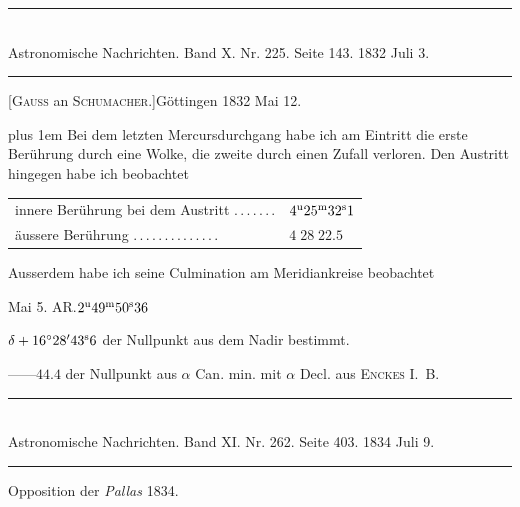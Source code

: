 \clearpage
{}
\begin{center}
\rule{0.55\linewidth}{0.4pt}\\[2pt]
Astronomische Nachrichten. Band X. Nr. 225. Seite 143. 1832 Juli 3.\\[2pt]
\rule{0.55\linewidth}{0.4pt}
\end{center}

\begin{center}[\textsc{Gauss} an \textsc{Schumacher.}]\quad Göttingen 1832 Mai 12.\end{center}

{\rightskip=0pt plus 1em Bei dem letzten Mercursdurchgang habe ich am Eintritt die erste Berührung durch eine Wolke, die zweite durch einen Zufall verloren. Den Austritt hingegen habe ich beobachtet\par}

\begin{center}
\begin{tabular}{ll}
innere Berührung bei dem Austritt \mbox{.\,.\,.\,.\,.\,.\,.} & $4^{\rm u}25^{\rm m}32^{\rm s}1$ \\
äussere Berührung \mbox{.\,.\,.\,.\,.\,.\,.\,.\,.\,.\,.\,.\,.\,.} & $4\;28\;22.5$ \\
\end{tabular}
\end{center}

Ausserdem habe ich seine Culmination am Meridiankreise beobachtet

\medskip
\noindent Mai 5. AR.\quad $2^{\rm u}49^{\rm m}50^{\rm s}36$\par
\noindent $\delta+16^\circ28'43^{\rm s}6$ der Nullpunkt aus dem Nadir bestimmt.\par
\noindent\hspace*{1em}---\quad ---\quad $44.4$ der Nullpunkt aus $\alpha$ Can. min. mit $\alpha$ Decl. aus \textsc{Enckes} \mbox{I. B.}

\clearpage
\hypertarget{native-468-pallas}{}
\begin{center}
\rule{0.55\linewidth}{0.4pt}\\[2pt]
Astronomische Nachrichten. Band XI. Nr. 262. Seite 403. 1834 Juli 9.\\[2pt]
\rule{0.55\linewidth}{0.4pt}
\end{center}

\begin{center}Opposition der \emph{Pallas} 1834.\end{center}

